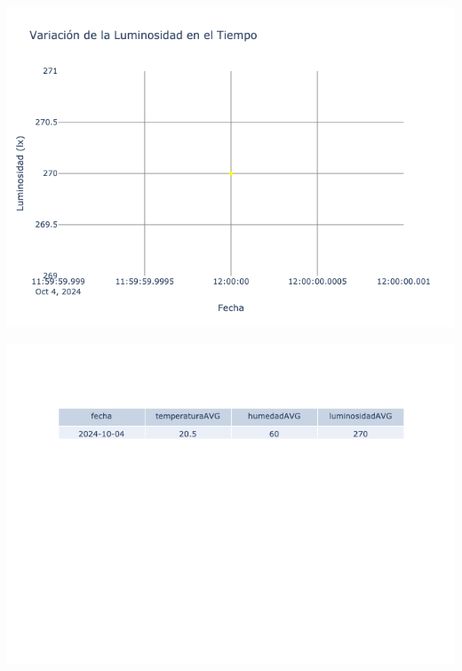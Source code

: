\documentclass{article}
\begin{document}
    \noindent
    \begin{minipage}{0.48\textwidth}
        \centering
        \includegraphics[width=\textwidth]{../img/poli/LS202-90Dias-03-12-2024.png}
    \end{minipage}
    \hfill
    \begin{minipage}{0.48\textwidth}
        \centering
        \includegraphics[width=\textwidth]{../img/tables/CAVG202-90Dias-03-12-2024.png}
    \end{minipage}
    
\end{document}
